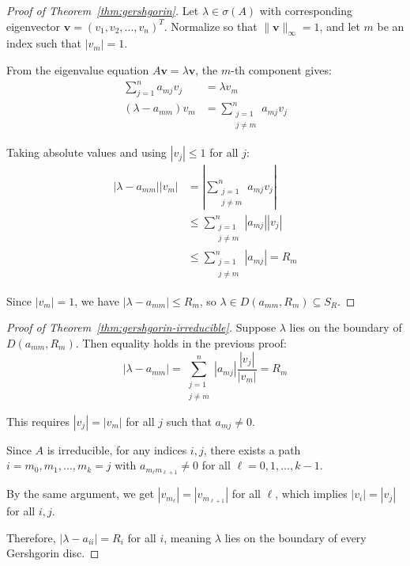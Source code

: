 \begin{proof}[Proof of Theorem~\ref{thm:gershgorin}]
    Let $\lambda \in \sigma(A)$ with corresponding eigenvector $\mathbf{v} = (v_1, v_2, \ldots, v_n)^T$.
    Normalize so that $\|\mathbf{v}\|_\infty = 1$, and let $m$ be an index such that $|v_m| = 1$.

    From the eigenvalue equation $A\mathbf{v} = \lambda\mathbf{v}$, the $m$-th component gives:
    \begin{align}
        \sum_{j=1}^n a_{mj} v_j &= \lambda v_m \\
        (\lambda - a_{mm}) v_m &= \sum_{\substack{j=1 \\ j \neq m}}^n a_{mj} v_j
    \end{align}

    Taking absolute values and using $|v_j| \leq 1$ for all $j$:
    \begin{align}
        |\lambda - a_{mm}||v_m| &= \left|\sum_{\substack{j=1 \\ j \neq m}}^n a_{mj} v_j\right| \\
        &\leq \sum_{\substack{j=1 \\ j \neq m}}^n |a_{mj}||v_j| \\
        &\leq \sum_{\substack{j=1 \\ j \neq m}}^n |a_{mj}| = R_m
    \end{align}

    Since $|v_m| = 1$, we have $|\lambda - a_{mm}| \leq R_m$, so $\lambda \in D(a_{mm}, R_m) \subseteq S_R$.
\end{proof}

\begin{proof}[Proof of Theorem~\ref{thm:gershgorin-irreducible}]

    Suppose $\lambda$ lies on the boundary of $D(a_{mm}, R_m)$. Then equality holds in the previous proof:
    \begin{equation}
        |\lambda - a_{mm}| = \sum_{\substack{j=1 \\ j \neq m}}^n |a_{mj}|\frac{|v_j|}{|v_m|} = R_m
    \end{equation}

    This requires $|v_j| = |v_m|$ for all $j$ such that $a_{mj} \neq 0$.

    Since $A$ is irreducible, for any indices $i, j$, there exists a path $i = m_0, m_1, \ldots, m_k = j$ with $a_{m_\ell m_{\ell+1}} \neq 0$ for all $\ell = 0, 1, \ldots, k-1$.

    By the same argument, we get $|v_{m_\ell}| = |v_{m_{\ell+1}}|$ for all $\ell$, which implies $|v_i| = |v_j|$ for all $i, j$.

    Therefore, $|\lambda - a_{ii}| = R_i$ for all $i$, meaning $\lambda$ lies on the boundary of every Gershgorin disc.
\end{proof}

